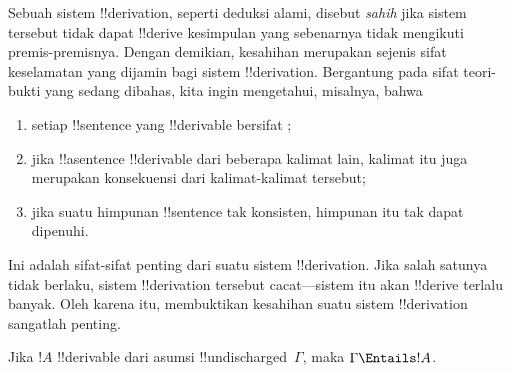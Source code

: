 \documentclass[../../../include/open-logic-section]{subfiles}
\begin{document}
      {}
      {}


\begin{explain}
Sebuah sistem !!{derivation}, seperti deduksi alami, disebut \emph{sahih} jika
sistem tersebut tidak dapat !!{derive} kesimpulan yang sebenarnya tidak
mengikuti premis-premisnya. Dengan demikian, kesahihan merupakan sejenis sifat keselamatan
yang dijamin bagi sistem !!{derivation}. Bergantung pada sifat teori-bukti
yang sedang dibahas, kita ingin mengetahui, misalnya, bahwa
\begin{enumerate}
\item setiap !!{sentence} yang !!{derivable} bersifat
  ;
\item jika !!a{sentence} !!{derivable} dari beberapa kalimat lain,
  kalimat itu juga merupakan konsekuensi dari kalimat-kalimat tersebut;
\item jika suatu himpunan !!{sentence} tak konsisten, himpunan itu tak
  dapat dipenuhi.
\end{enumerate}
Ini adalah sifat-sifat penting dari suatu sistem !!{derivation}. Jika salah
satunya tidak berlaku, sistem !!{derivation} tersebut cacat---sistem itu
akan !!{derive} terlalu banyak. Oleh karena itu, membuktikan kesahihan
suatu sistem !!{derivation} sangatlah penting.
\end{explain}

\begin{thm}[Kesahihan]
Jika $!A$ !!{derivable} dari asumsi !!{undischarged}~$\Gamma$, maka
$\Gamma \Entails !A$.
\end{thm}
\end{document}
